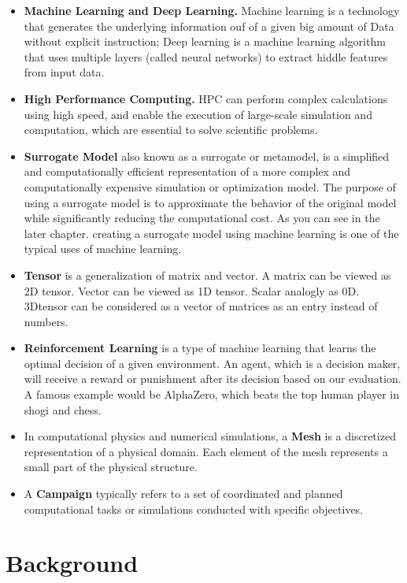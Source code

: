 \documentclass[conference]{IEEEtran}
\begin{document}
\begin{itemize}
\item \textbf{Machine Learning and Deep Learning.} Machine learning is a technology that generates the underlying information ouf of a given big amount of Data without explicit instruction; Deep learning is a machine learning algorithm that uses multiple layers (called neural networks) to extract hiddle features from input data.
\item \textbf{High Performance Computing.} HPC can perform complex calculations using high speed, and enable the execution of large-scale simulation and computation, which are essential to solve scientific problems.
\item \textbf{Surrogate Model} also known as a surrogate or metamodel, is a simplified and computationally efficient representation of a more complex and computationally expensive simulation or optimization model. The purpose of using a surrogate model is to approximate the behavior of the original model while significantly reducing the computational cost. As you can see in the later chapter. creating a surrogate model using machine learning is one of the
typical uses of machine learning.
\item \textbf{Tensor} is a generalization of matrix and vector. A matrix can be viewed as 2D tensor. Vector can be viewed as 1D tensor. Scalar analogly
as 0D. 3Dtensor can be considered as a vector of matrices as an entry instead of numbers.
\item \textbf{Reinforcement Learning} is a type of machine learning that learns the optimal decision of a given environment. An agent, which is a decision maker, will receive a reward or punishment after its decision based on our evaluation. A famous example would be AlphaZero, which beats the top human player in shogi and chess.
\item In computational physics and numerical simulations, a \textbf{Mesh} is a discretized representation of a physical domain. Each element of the mesh represents a small part of the physical structure.
\item A \textbf{Campaign} typically refers to a set of coordinated and planned computational tasks or simulations conducted with specific objectives.
\end{itemize}

\section{Background}
\end{document}
